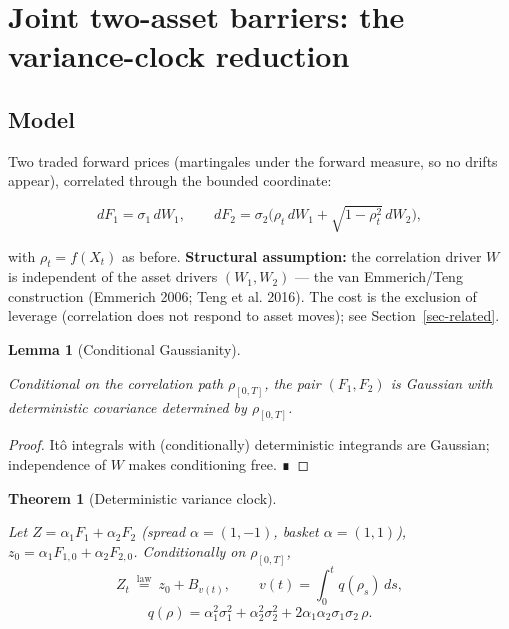 \documentclass[
  english,
  10pt,
  letterpaper,
  DIV=11,
  numbers=noendperiod]{scrartcl}
\theoremstyle{plain}
\newtheorem{theorem}{Theorem}[section]
\theoremstyle{plain}
\theoremstyle{plain}
\newtheorem{lemma}{Lemma}[section]
\theoremstyle{plain}
\theoremstyle{definition}
\theoremstyle{remark}
\begin{document}
\section{Joint two-asset barriers: the variance-clock
reduction}\label{sec-reduction}

\subsection{Model}\label{model}

Two traded forward prices (martingales under the forward measure, so no
drifts appear), correlated through the bounded coordinate:

\[
dF_1=\sigma_1\,dW_1,\qquad
dF_2=\sigma_2\big(\rho_t\,dW_1+\sqrt{1-\rho_t^{2}}\,dW_2\big),
\]

with \(\rho_t=f(X_t)\) as before. \textbf{Structural assumption:} the
correlation driver \(W\) is independent of the asset drivers
\((W_1,W_2)\) --- the van Emmerich/Teng construction (Emmerich 2006;
Teng et al. 2016). The cost is the exclusion of leverage (correlation
does not respond to asset moves); see Section~\ref{sec-related}.

\begin{lemma}[Conditional
Gaussianity]\protect\hypertarget{lem-gaussian}{}\label{lem-gaussian}

Conditional on the correlation path \(\rho_{[0,T]}\), the pair
\((F_1,F_2)\) is Gaussian with deterministic covariance determined by
\(\rho_{[0,T]}\).

\end{lemma}

\begin{proof}
Itô integrals with (conditionally) deterministic integrands are
Gaussian; independence of \(W\) makes conditioning free. ∎
\end{proof}

\begin{theorem}[Deterministic variance
clock]\protect\hypertarget{thm-clock}{}\label{thm-clock}

Let \(Z=\alpha_1F_1+\alpha_2F_2\) (spread \(\alpha=(1,-1)\), basket
\(\alpha=(1,1)\)), \(z_0=\alpha_1F_{1,0}+\alpha_2F_{2,0}\).
Conditionally on \(\rho_{[0,T]}\), \[
Z_t\ \stackrel{\mathrm{law}}{=}\ z_0+B_{v(t)},\qquad
v(t)=\int_0^{t}q(\rho_s)\,ds,
\] \[
q(\rho)=\alpha_1^{2}\sigma_1^{2}+\alpha_2^{2}\sigma_2^{2}
+2\alpha_1\alpha_2\sigma_1\sigma_2\,\rho .
\]

\end{theorem}
\end{document}
